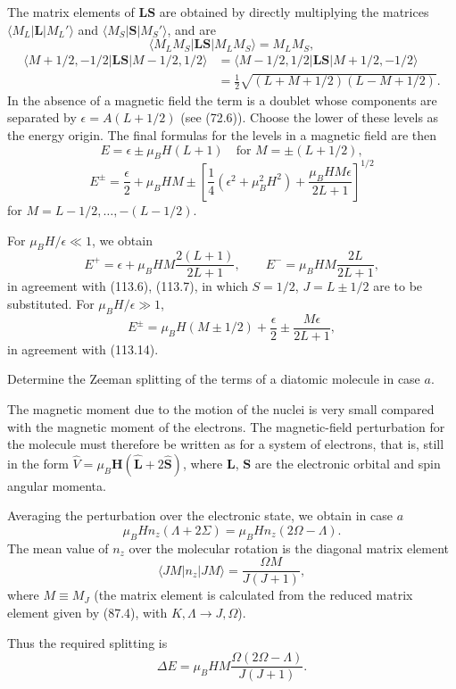 The matrix elements of $\mathbf L\mathbf S$ are obtained by directly multiplying the matrices $\langle M_L|\mathbf L|M_L'\rangle$ and $\langle M_S|\mathbf S|M_S'\rangle$, and are
\[
 \langle M_LM_S|\mathbf L\mathbf S|M_LM_S\rangle=M_LM_S,
\]
\[
 \begin{split}
 \langle M+1/2,-1/2|\mathbf L\mathbf S|M-1/2,1/2\rangle
 &=\langle M-1/2,1/2|\mathbf L\mathbf S|M+1/2,-1/2\rangle\\
 &=\frac12\sqrt{(L+M+1/2)(L-M+1/2)}.
 \end{split}
\]
In the absence of a magnetic field the term is a doublet whose components are separated by $\epsilon=A(L+1/2)$ (see (72.6)). Choose the lower of these levels as the energy origin. The final formulas for the levels in a magnetic field are then
\[
 E=\epsilon\pm\mu_BH(L+1)\quad\text{for }M=\pm(L+1/2),
\]
\[
 E^{\pm}=\frac\epsilon2+\mu_BHM\pm\left[\frac14(\epsilon^2+\mu_B^2H^2)+\frac{\mu_BHM\epsilon}{2L+1}\right]^{1/2}
\]
for $M=L-1/2,\ldots,-(L-1/2)$.

For $\mu_BH/\epsilon\ll1$, we obtain
\[
 E^+=\epsilon+\mu_BHM\frac{2(L+1)}{2L+1},\qquad E^-=\mu_BHM\frac{2L}{2L+1},
\]
in agreement with (113.6), (113.7), in which $S=1/2$, $J=L\pm1/2$ are to be substituted. For $\mu_BH/\epsilon\gg1$,
\[
 E^\pm=\mu_BH(M\pm1/2)+\frac\epsilon2\pm\frac{M\epsilon}{2L+1},
\]
in agreement with (113.14).

 Determine the Zeeman splitting of the terms of a diatomic molecule in case $a$.

\SolutionHeading The magnetic moment due to the motion of the nuclei is very small compared with the magnetic moment of the electrons. The magnetic-field perturbation for the molecule must therefore be written as for a system of electrons, that is, still in the form $\hat V=\mu_B\mathbf H(\hat{\mathbf L}+2\hat{\mathbf S})$, where $\mathbf L$, $\mathbf S$ are the electronic orbital and spin angular momenta.

Averaging the perturbation over the electronic state, we obtain in case $a$
\[
 \mu_BHn_z(\Lambda+2\Sigma)=\mu_BHn_z(2\Omega-\Lambda).
\]
The mean value of $n_z$ over the molecular rotation is the diagonal matrix element
\[
 \langle JM|n_z|JM\rangle=\frac{\Omega M}{J(J+1)},
\]
where $M\equiv M_J$ (the matrix element is calculated from the reduced matrix element given by (87.4), with $K,\Lambda\to J,\Omega$).

Thus the required splitting is
\[
 \Delta E=\mu_BHM\frac{\Omega(2\Omega-\Lambda)}{J(J+1)}.
\]

